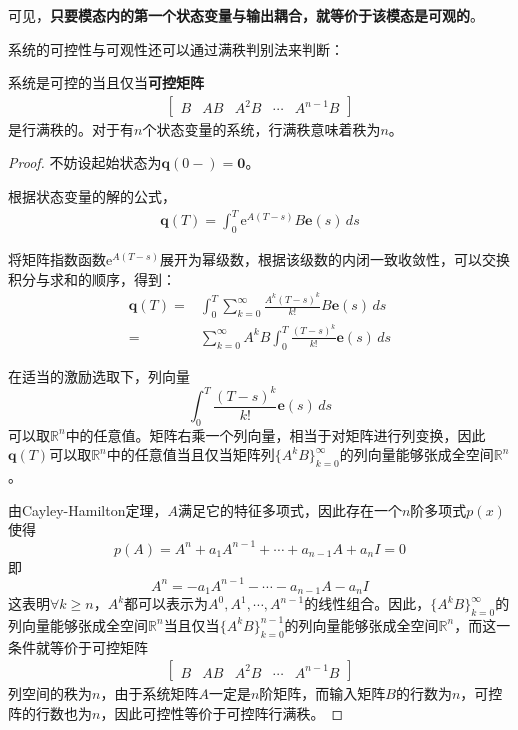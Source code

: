 可见，\textbf{只要模态内的第一个状态变量与输出耦合，就等价于该模态是可观的}。

系统的可控性与可观性还可以通过满秩判别法来判断：

\begin{theorem}[可控性的满秩判别法]
    系统是可控的当且仅当\textbf{可控矩阵}
    \begin{align*}
    \begin{bmatrix}
    B & AB & A^2B & \cdots & A^{n-1}B
    \end{bmatrix}
    \end{align*}
    是行满秩的。对于有$n$个状态变量的系统，行满秩意味着秩为$n$。
\end{theorem}
\begin{proof}
    不妨设起始状态为$\mathbf{q}(0-)=\mathbf{0}$。

    根据状态变量的解的公式，\begin{align*}
    \mathbf{q}(T)=\int_0^T \mathrm{e}^{A(T-s)}B\mathbf{e}(s)\,ds
    \end{align*}

    将矩阵指数函数$\mathrm{e}^{A(T-s)}$展开为幂级数，根据该级数的内闭一致收敛性，可以交换积分与求和的顺序，得到：\begin{align*}
    \mathbf{q}(T)=&\int_0^T \sum_{k=0}^\infty \frac{A^k(T-s)^k}{k!}B\mathbf{e}(s)\,ds\\
    =&\sum_{k=0}^\infty A^k B\int_0^T \frac{(T-s)^k}{k!} \mathbf{e}(s)\,ds
    \end{align*}

    在适当的激励选取下，列向量
    $$\int_0^T \frac{(T-s)^k}{k!} \mathbf{e}(s)\,ds$$
    可以取$\mathbb{R}^n$中的任意值。矩阵右乘一个列向量，相当于对矩阵进行列变换，因此$\mathbf{q}(T)$可以取$\mathbb{R}^n$中的任意值当且仅当矩阵列$\{A^k B\}_{k=0}^\infty$的列向量能够张成全空间$\mathbb{R}^n$。

    由Cayley-Hamilton定理，$A$满足它的特征多项式，因此存在一个$n$阶多项式$p(x)$使得
    $$p(A)=A^n+a_1 A^{n-1}+\cdots+a_{n-1}A+a_n I=0$$
    即
    $$A^n=-a_1 A^{n-1}-\cdots-a_{n-1}A-a_n I$$
    这表明$\forall k\geq n$，$A^k$都可以表示为$A^0,A^1,\cdots,A^{n-1}$的线性组合。因此，$\{A^k B\}_{k=0}^\infty$的列向量能够张成全空间$\mathbb{R}^n$当且仅当$\{A^k B\}_{k=0}^{n-1}$的列向量能够张成全空间$\mathbb{R}^n$，而这一条件就等价于可控矩阵\begin{align*}
    \begin{bmatrix}
    B & AB & A^2B & \cdots & A^{n-1}B
    \end{bmatrix}
    \end{align*}
    列空间的秩为$n$，由于系统矩阵$A$一定是$n$阶矩阵，而输入矩阵$B$的行数为$n$，可控阵的行数也为$n$，因此可控性等价于可控阵行满秩。
\end{proof}

